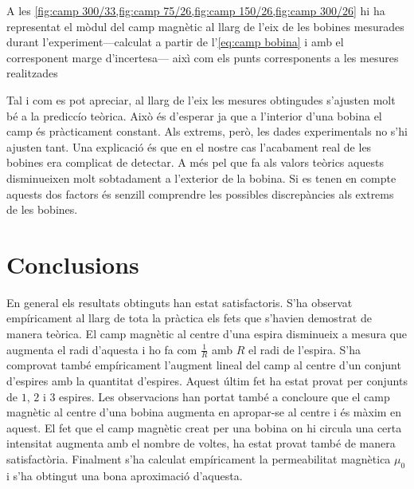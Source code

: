 A les \cref{fig:camp 300/33,fig:camp 75/26,fig:camp 150/26,fig:camp 300/26} hi ha representat el mòdul del camp magnètic al llarg de l'eix de les bobines mesurades durant l'experiment---calculat a partir de l'\cref{eq:camp bobina} i amb el corresponent marge d'incertesa--- aixì com els punts corresponents a les mesures realitzades

Tal i com es pot apreciar, al llarg de l'eix les mesures obtingudes s'ajusten molt bé a la prediccío teòrica. Això és d'esperar ja que a l'interior d'una bobina el camp és pràcticament constant. Als extrems, però, les dades experimentals no s'hi ajusten tant. Una explicació és que en el nostre cas l'acabament real de les bobines era complicat de detectar. A més pel que fa als valors teòrics aquests disminueixen molt sobtadament a l'exterior de la bobina. Si es tenen en compte aquests dos factors és senzill comprendre les possibles discrepàncies als extrems de les bobines.

\section{Conclusions}
En general els resultats obtinguts han estat satisfactoris. S'ha observat empíricament al llarg de tota la pràctica els fets que s'havien demostrat de manera teòrica. El camp magnètic al centre d'una espira disminueix a mesura que augmenta el radi d'aquesta i ho fa com $\frac{1}{R}$ amb $R$ el radi de l'espira. S'ha comprovat també empíricament l'augment lineal del camp al centre d'un conjunt d'espires amb la quantitat d'espires. Aquest últim fet ha estat provat per conjunts de $1$, $2$ i $3$ espires. Les observacions han portat també a concloure que el camp magnètic al centre d'una bobina augmenta en apropar-se al centre i és màxim en aquest. El fet que el camp magnètic creat per una bobina on hi circula una certa intensitat augmenta amb el nombre de voltes, ha estat provat també de manera satisfactòria. Finalment s'ha calculat empíricament la permeabilitat magnètica $\mu_{0}$ i s'ha obtingut una bona aproximació d'aquesta.




